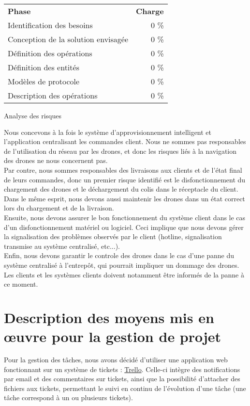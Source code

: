 \begin{center}
    \begin{tabular}{lr}
        \textbf{Phase} & \textbf{Charge} \\
    Identification des besoins & 0 \% \\
    Conception de la solution envisagée & 0 \% \\
    Définition des opérations & 0 \% \\
    Définition des entités & 0 \% \\
    Modèles de protocole & 0 \% \\
    Description des opérations & 0 \%
    \end{tabular}
\end{center}

Analyse des risques


Nous concevons à la fois le système d'approvisionnement intelligent et
l'application centralisant les commandes client. Nous ne sommes pas
responsables de l'utilisation du réseau par les drones, et donc les risques
liés à la navigation des drones ne nous concernent pas. \\

Par contre, nous sommes responsables des livraisons aux clients et de l'état
final de leurs commandes, donc un premier risque identifié est le
disfonctionnement du chargement des drones et le déchargement du colis dans le
réceptacle du client. Dans le même esprit, nous devons aussi maintenir les
drones dans un état correct lors du chargement et de la livraison. \\

Ensuite, nous devons assurer le bon fonctionnement du système client dans le
cas d'un disfonctionnement matériel ou logiciel. Ceci implique que nous devons
gérer la signalisation des problèmes observés par le client (hotline,
signalisation transmise au système centralisé, etc...). \\

Enfin, nous devons garantir le controle des drones dans le cas d'une panne du
système centralisé à l'entrepôt, qui pourrait impliquer un dommage des drones.
Les clients et les systèmes clients doivent notamment être informés de la panne
à ce moment.

\section{Description des moyens mis en œuvre pour la gestion de projet}

Pour la gestion des tâches, nous avons décidé d'utiliser une application web
fonctionnant sur un système de tickets : \href{https://trello.com}{Trello}. Celle-ci
intègre des notifications par email et des commentaires sur tickets, ainsi que
la possibilité d'attacher des fichiers aux tickets, permettant le suivi en
continu de l'évolution d'une tâche (une tâche correspond à un ou plusieurs
tickets). \\

